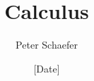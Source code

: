 

  
\title{Calculus}
\author{Peter Schaefer}
\date{[Date]}



\maketitle
\tableofcontents
\newpage

